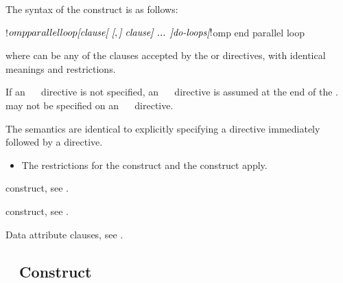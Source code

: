 \begin{fortranspecific}
The syntax of the   construct is as follows:

\begin{ompfPragma}
!$omp parallel loop \plc{[clause[ [},\plc{] clause] ... ]}
   \plc{do-loops}
\plc{[}!$omp end parallel loop\plc{]}
\end{ompfPragma}

where  can be any of the clauses accepted by the  or
   directives, with identical meanings and restrictions.

If an ~~ directive is not specified, an
~~ directive is assumed at the end of the
.  may not be specified on an
~~ directive.
\end{fortranspecific}

\descr
The semantics are identical to explicitly specifying a  directive 
immediately followed by a  directive. 

\restrictions
\begin{itemize}
\item The restrictions for the  construct and the
   construct apply.
\end{itemize}

\begin{crossrefs}
\item {} construct, see
.

\item {} construct, see
.

\item Data attribute clauses, see
.
\end{crossrefs}




\subsection{~ Construct}
\label{subsec:parallel sections Construct}

